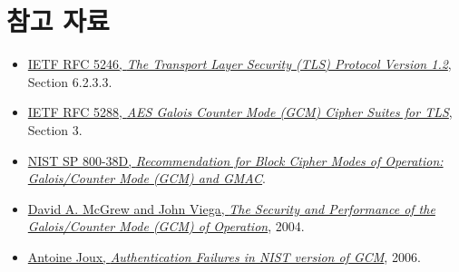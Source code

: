 \documentclass[10pt,a4paper]{article}
\begin{document}
\section{참고 자료}

\begin{itemize}
  \item \href{https://www.rfc-editor.org/rfc/rfc5246.html#section-6.2.3.3}
        {IETF RFC 5246, \emph{The Transport Layer Security (TLS) Protocol
        Version 1.2}}, Section 6.2.3.3.
  \item \href{https://www.rfc-editor.org/rfc/rfc5288.html#section-3}
        {IETF RFC 5288, \emph{AES Galois Counter Mode (GCM) Cipher Suites for
        TLS}}, Section 3.
  \item \href{https://doi.org/10.6028/NIST.SP.800-38D}
        {NIST SP 800-38D, \emph{Recommendation for Block Cipher Modes of
        Operation: Galois/Counter Mode (GCM) and GMAC}}.
  \item \href{https://eprint.iacr.org/2004/193}
        {David A. McGrew and John Viega, \emph{The Security and Performance of
        the Galois/Counter Mode (GCM) of Operation}}, 2004.
  \item \href{https://csrc.nist.gov/CSRC/media/Projects/Block-Cipher-Techniques/documents/BCM/Comments/800-38-series-drafts/GCM/Joux_comments.pdf}
        {Antoine Joux, \emph{Authentication Failures in NIST version of GCM}},
        2006.
\end{itemize}
\end{document}
